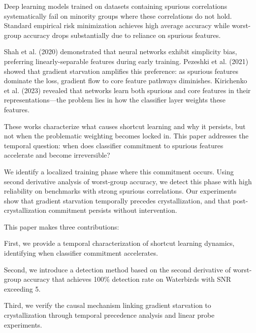 
Deep learning models trained on datasets containing spurious correlations systematically fail on minority groups where these correlations do not hold. Standard empirical risk minimization achieves high average accuracy while worst-group accuracy drops substantially due to reliance on spurious features.

Shah et al. (2020) demonstrated that neural networks exhibit simplicity bias, preferring linearly-separable features during early training. Pezeshki et al. (2021) showed that gradient starvation amplifies this preference: as spurious features dominate the loss, gradient flow to core feature pathways diminishes. Kirichenko et al. (2023) revealed that networks learn both spurious and core features in their representations---the problem lies in how the classifier layer weights these features.

These works characterize what causes shortcut learning and why it persists, but not when the problematic weighting becomes locked in. This paper addresses the temporal question: when does classifier commitment to spurious features accelerate and become irreversible?

We identify a localized training phase where this commitment occurs. Using second derivative analysis of worst-group accuracy, we detect this phase with high reliability on benchmarks with strong spurious correlations. Our experiments show that gradient starvation temporally precedes crystallization, and that post-crystallization commitment persists without intervention.

This paper makes three contributions:

First, we provide a temporal characterization of shortcut learning dynamics, identifying when classifier commitment accelerates.

Second, we introduce a detection method based on the second derivative of worst-group accuracy that achieves 100\% detection rate on Waterbirds with SNR exceeding 5.

Third, we verify the causal mechanism linking gradient starvation to crystallization through temporal precedence analysis and linear probe experiments.

